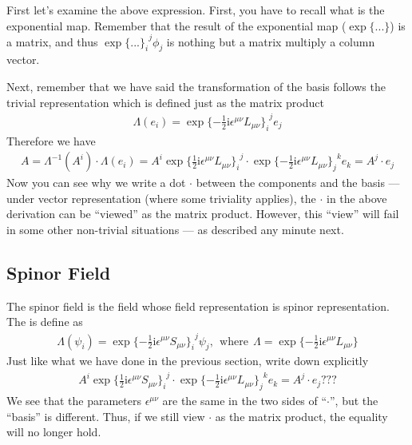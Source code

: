 \documentclass[letterpaper,10pt,english]{sphinxmanual}
\begin{document}
First let's examine the above expression. First, you have to recall what is the exponential map. Remember that the result of the exponential map (\(\exp\{...\}\)) is a matrix, and thus \(\exp\{...{\}_i}^j\phi_j\) is nothing but a matrix multiply a column vector.

Next, remember that we have said the transformation of the basis follows the trivial representation which is defined just as the matrix product
\begin{equation*}
\begin{split}\varLambda(e_i) = \exp\{-\frac{1}{2}\mathrm{i}\epsilon^{\mu\nu}L_{\mu\nu}{\}_i}^je_j\end{split}
\end{equation*}
Therefore we have
\begin{equation*}
\begin{split}A = \varLambda^{-1}(A^i)\cdot\varLambda(e_i) = A^i \exp\{\frac{1}{2}\mathrm{i}\epsilon^{\mu\nu}L_{\mu\nu}{\}_i}^j \cdot \exp\{-\frac{1}{2}\mathrm{i}\epsilon^{\mu\nu}L_{\mu\nu}{\}_j}^k e_k = A^j\cdot e_j\end{split}
\end{equation*}
Now you can see why we write a dot \(\cdot\) between the components and the basis --- under vector representation (where some triviality applies), the \(\cdot\) in the above derivation can be ``viewed'' as the matrix product. However, this ``view'' will fail in some other non-trivial situations --- as described any minute next.


\subsection{Spinor Field}
\label{\detokenize{field:spinor-field}}
The spinor field is the field whose field representation is spinor representation. The  is define as
\begin{equation*}
\begin{split}\varLambda(\psi_i) = \exp\{-\frac{1}{2}\mathrm{i}\epsilon^{\mu\nu}S_{\mu\nu}{\}_i}^j\psi_j, \ \ \text{where}\ \ \varLambda = \exp\{-\frac{1}{2}\mathrm{i}\epsilon^{\mu\nu}L_{\mu\nu}\}\end{split}
\end{equation*}
Just like what we have done in the previous section, write down explicitly
\begin{equation*}
\begin{split}A^i \exp\{\frac{1}{2}\mathrm{i}\epsilon^{\mu\nu}S_{\mu\nu}{\}_i}^j \cdot \exp\{-\frac{1}{2}\mathrm{i}\epsilon^{\mu\nu}L_{\mu\nu}{\}_j}^k e_k =  A^j\cdot e_j ???\end{split}
\end{equation*}
We see that the parameters \(\epsilon^{\mu\nu}\) are the same in the two sides of “\(\cdot\)”, but the ``basis'' is different. Thus, if we still view \(\cdot\) as the matrix product, the equality will no longer hold.
\end{document}
